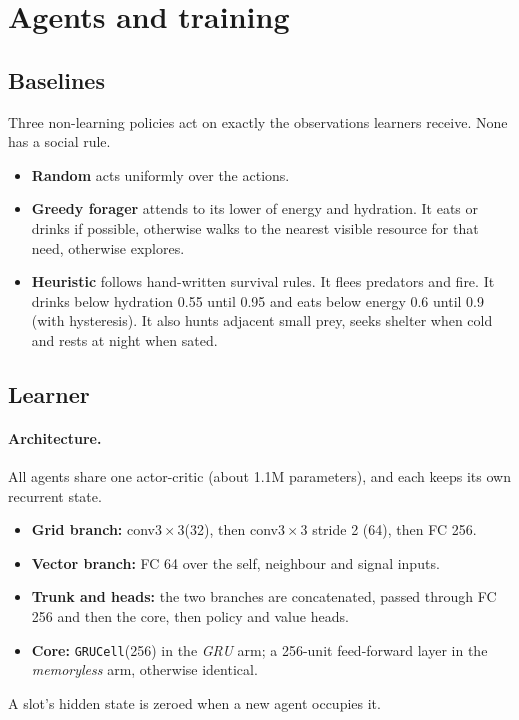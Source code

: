\documentclass[10pt]{article}
\begin{document}
\section{Agents and training}
\label{sec:agents}

\subsection{Baselines}
Three non-learning policies act on exactly the observations learners receive. None has a social rule.
\begin{itemize}
\item \textbf{Random} acts uniformly over the actions.
\item \textbf{Greedy forager} attends to its lower of energy and hydration. It eats or drinks if possible, otherwise
walks to the nearest visible resource for that need, otherwise explores.
\item \textbf{Heuristic} follows hand-written survival rules. It flees predators and fire. It drinks below hydration
0.55 until 0.95 and eats below energy 0.6 until 0.9 (with hysteresis). It also hunts adjacent small prey, seeks
shelter when cold and rests at night when sated.
\end{itemize}

\subsection{Learner}
\paragraph{Architecture.}
All agents share one actor-critic (about 1.1M parameters), and each keeps its own recurrent state.
\begin{itemize}
\item \textbf{Grid branch:} conv$3{\times}3$(32), then conv$3{\times}3$ stride 2 (64), then FC 256.
\item \textbf{Vector branch:} FC 64 over the self, neighbour and signal inputs.
\item \textbf{Trunk and heads:} the two branches are concatenated, passed through FC 256 and then the core, then
policy and value heads.
\item \textbf{Core:} \texttt{GRUCell}(256) \citep{cho2014gru} in the \emph{GRU} arm; a 256-unit feed-forward layer in
the \emph{memoryless} arm, otherwise identical.
\end{itemize}
A slot's hidden state is zeroed when a new agent occupies it.
\end{document}
